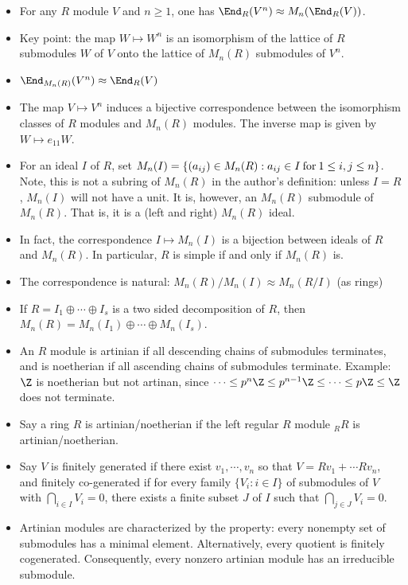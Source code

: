 \documentclass[11pt]{amsart}
\begin{document}
\begin{itemize}
  \item For any $R$ module $V$ and $n\geq 1$, one has $\End_R(V^n) \approx M_n(\End_R(V))$.
  \item Key point: the map $W \mapsto W^n$ is an isomorphism of the lattice of $R$ submodules $W$ of $V$ onto the lattice of $M_n(R)$ submodules of $V^n$.
  \item $\End_{M_n(R)} (V^n ) \approx \End_R(V)$ 
  \item The map $V \mapsto V^n$ induces a bijective correspondence between the isomorphism classes of $R$ modules and $M_n(R)$ modules. The inverse map is given by $W \mapsto e_{11} W$. 
  \item For an ideal $I$ of $R$, set $M_n(I)=\{ (a_{ij}) \in M_n(R) : a_{ij} \in I \: {\rm for}\: 1 \leq i,j \leq n\}$. Note, this is not a subring of $M_n(R)$ in the author's definition: unless $I=R$, $M_n(I)$ will not have  a unit. It is, however, an $M_n(R)$ submodule of $M_n(R)$. That is, it is a (left and right) $M_n(R)$ ideal. 
  \item In fact, the correspondence $I\mapsto M_n(I)$ is a bijection between ideals of $R$ and $M_n(R)$. In particular, $R$ is simple if and only if $M_n(R)$ is. 
  \item The correspondence is natural: $M_n(R)/M_n(I) \approx M_n(R/I)$ (as rings) 
  \item If $R=I_1 \oplus \cdots \oplus I_s$ is a two sided decomposition of $R$, then $M_n(R) = M_n(I_1) \oplus \cdots \oplus M_n(I_s)$. 
  \item An $R$ module is artinian if all descending chains of submodules terminates, and is noetherian if all ascending chains of submodules terminate. Example: $\Z$ is noetherian but not artinan, since $\cdots \leq p^n\Z \leq p^{n-1} \Z \leq \cdots \leq p\Z \leq \Z$ does not terminate. 
  \item Say a ring $R$ is artinian/noetherian if the left regular $R$ module $_R R$ is artinian/noetherian.
  \item Say $V$ is finitely generated if there exist $v_1,\cdots, v_n$ so that $V=Rv_1+\cdots Rv_n$, and finitely co-generated if for every family $\{V_i: i\in I\}$ of submodules of $V$ with $\bigcap_{i \in I} V_i =0$, there exists a finite subset $J$ of $I$ such that $\bigcap_{j \in J} V_i =0$.
  \item Artinian modules are characterized by the property: every nonempty set of submodules has a minimal element. Alternatively, every quotient is finitely cogenerated. Consequently, every nonzero artinian module has an irreducible submodule.  

\end{itemize}
\end{document}
